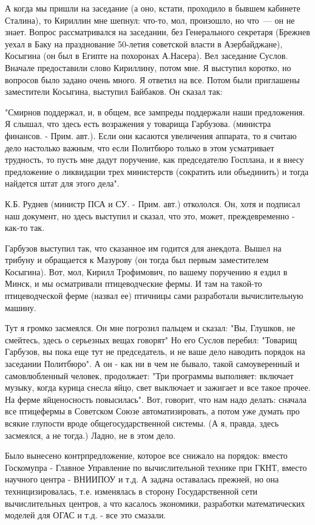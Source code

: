 А когда мы пришли на заседание (а оно, кстати, проходило в бывшем кабинете
Сталина), то Кириллин мне шепнул: что-то, мол, произошло, но что\ --- он не
знает. Вопрос рассматривался на заседании, без Генерального секретаря (Брежнев
уехал в Баку на празднование 50-летия советской власти в Азербайджане), Косыгина
(он был в Египте на похоронах А.Насера). Вел заседание Суслов. Вначале
предоставили слово Кириллину, потом мне. Я выступил коротко, но вопросов было
задано очень много. Я ответил на все. Потом были приглашены заместители
Косыгина, выступил Байбаков. Он сказал так:

"Смирнов поддержал, и, в общем, все зампреды поддержали наши предложения. Я
слышал, что здесь есть возражения у товарища Гарбузова. (министра финансов. -
Прим. авт.). Если они касаются увеличения аппарата, то я считаю дело настолько
важным, что если Политбюро только в этом усматривает трудность, то пусть мне
дадут поручение, как председателю Госплана, и я внесу предложение о ликвидации
трех министерств (сократить или объединить) и тогда найдется штат для этого
дела".

К.Б. Руднев (министр ПСА и СУ. - Прим. авт.) откололся. Он, хотя и подписал наш
документ, но здесь выступил и сказал, что это, может, преждевременно - как-то
так.

Гарбузов выступил так, что сказанное им годится для анекдота. Вышел на трибуну и
обращается к Мазурову (он тогда был первым заместителем Косыгина). Вот, мол,
Кирилл Трофимович, по вашему поручению я ездил в Минск, и мы осматривали
птицеводческие фермы. И там на такой-то птицеводческой ферме (назвал ее)
птичницы сами разработали вычислительную машину.

Тут я громко засмеялся. Он мне погрозил пальцем и сказал: "Вы, Глушков, не
смейтесь, здесь о серьезных вещах говорят" Но его Суслов перебил: "Товарищ
Гарбузов, вы пока еще тут не председатель, и не ваше дело наводить порядок на
заседании Политбюро". А он - как ни в чем не бывало, такой самоуверенный и
самовлюбленный человек, продолжает: "Три программы выполняет: включает музыку,
когда курица снесла яйцо, свет выключает и зажигает и все такое прочее. На ферме
яйценосность повысилась". Вот, говорит, что нам надо делать: сначала все
птицефермы в Советском Союзе автоматизировать, а потом уже думать про всякие
глупости вроде общегосударственной системы. (А я, правда, здесь засмеялся, а не
тогда.) Ладно, не в этом дело.

Было вынесено контрпредложение, которое все снижало на порядок: вместо
Госкомупра - Главное Управление по вычислительной технике при ГКНТ, вместо
научного центра - ВНИИПОУ и т.д. А задача оставалась прежней, но она
техницизировалась, т.е. изменялась в сторону Государственной сети вычислительных
центров, а что касалось экономики, разработки математических моделей для ОГАС и
т.д. - все это смазали.

